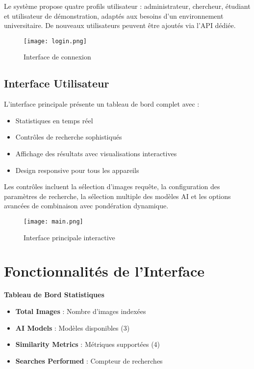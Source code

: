 \documentclass[12pt,a4paper]{article}
\begin{document}
Le système propose quatre profils utilisateur : administrateur, chercheur, étudiant et utilisateur de démonstration, adaptés aux besoins d'un environnement universitaire. De nouveaux utilisateurs peuvent être ajoutés via l'API dédiée.

\begin{figure}[H]
  \centering
  \texttt{[image: login.png]}
  \caption{Interface de connexion}
  \label{fig:login_interface}
\end{figure}

\subsection{Interface Utilisateur}

\begin{implementedbox}
L'interface principale présente un tableau de bord complet avec :
\begin{itemize}
    \item Statistiques en temps réel
    \item Contrôles de recherche sophistiqués
    \item Affichage des résultats avec visualisations interactives
    \item Design responsive pour tous les appareils
\end{itemize}

Les contrôles incluent la sélection d'images requête, la configuration des paramètres de recherche, la sélection multiple des modèles AI et les options avancées de combinaison avec pondération dynamique.
\end{implementedbox}

\begin{figure}[H]
  \centering
  \texttt{[image: main.png]}
  \caption{Interface principale interactive}
  \label{fig:main_interface}
\end{figure}

\section*{Fonctionnalités de l'Interface}

\textbf{Tableau de Bord Statistiques}
\begin{itemize}[leftmargin=2em]
  \item \textbf{Total Images} : Nombre d'images indexées
  \item \textbf{AI Models} : Modèles disponibles (3)
  \item \textbf{Similarity Metrics} : Métriques supportées (4)
  \item \textbf{Searches Performed} : Compteur de recherches
\end{itemize}
\end{document}
